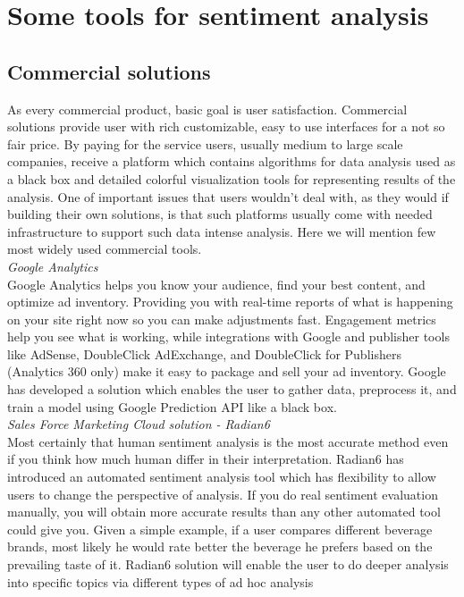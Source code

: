 \section{Some tools for sentiment analysis}

\subsection*{Commercial solutions}
As every commercial product, basic goal is user satisfaction. Commercial solutions provide user with rich customizable, easy to use interfaces for a not so fair price. By paying for the service users, usually medium to large scale companies, receive a platform which contains algorithms for data analysis used as a black box and detailed colorful visualization tools for representing results of the analysis. One of important issues that users wouldn’t deal with, as they would if building their own solutions, is that such platforms usually come with needed infrastructure to support such data intense analysis. Here we will mention few most widely used commercial tools.\\
\textit{Google Analytics\\}
Google Analytics helps you know your audience, find your best content, and optimize ad inventory. Providing you with real-time reports of what is happening on your site right now so you can make adjustments fast. Engagement metrics help you see what is working, while integrations with Google and publisher tools like AdSense, DoubleClick AdExchange, and DoubleClick for Publishers (Analytics 360 only) make it easy to package and sell your ad inventory.  Google has developed a solution which enables the user to gather data, preprocess it, and train a model using Google Prediction API like a black box.\\
\textit{Sales Force Marketing Cloud solution - Radian6\\}
Most certainly that human sentiment analysis is the most accurate method even if you think how much human differ in their interpretation. Radian6 has introduced an automated sentiment analysis tool which has flexibility to allow users to change the perspective of analysis. If you do real sentiment evaluation manually, you will obtain more accurate results than any other automated tool could give you. Given a simple example, if a user compares different beverage brands, most likely he would rate better the beverage he prefers based on the prevailing taste of it. Radian6 solution will enable the user to do deeper analysis into specific topics via different types of ad hoc analysis

